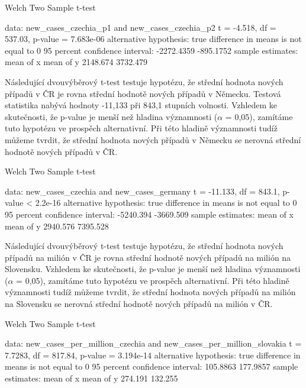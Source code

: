 \documentclass[a4paper, 12pt]{article}
\begin{document}
\begin{Schunk}
\begin{Soutput}
	Welch Two Sample t-test

data:  new_cases_czechia_p1 and new_cases_czechia_p2
t = -4.518, df = 537.03, p-value = 7.683e-06
alternative hypothesis: true difference in means is not equal to 0
95 percent confidence interval:
 -2272.4359  -895.1752
sample estimates:
mean of x mean of y 
 2148.674  3732.479 
\end{Soutput}
\end{Schunk}

\clearpage

Následující dvouvýběrový t-test testuje hypotézu, že střední hodnota nových případů
v ČR je rovna střední hodnotě nových případů v Německu. Testová statistika nabývá hodnoty
-11,133 při 843,1 stupních volnosti. Vzhledem ke skutečnosti, že p-value je menší
než hladina významnosti ($\alpha$ = 0,05), zamítáme tuto hypotézu ve prospěch alternativní.
Při této hladině významnosti tudíž můžeme tvrdit, že střední hodnota nových případů v Německu
se nerovná střední hodnotě nových případů v ČR.
\begin{Schunk}
\begin{Soutput}
	Welch Two Sample t-test

data:  new_cases_czechia and new_cases_germany
t = -11.133, df = 843.1, p-value < 2.2e-16
alternative hypothesis: true difference in means is not equal to 0
95 percent confidence interval:
 -5240.394 -3669.509
sample estimates:
mean of x mean of y 
 2940.576  7395.528 
\end{Soutput}
\end{Schunk}

Následující dvouvýběrový t-test testuje hypotézu, že střední hodnota nových případů na milión
v ČR je rovna střední hodnotě nových případů na milión na Slovensku. Vzhledem ke skutečnosti, že p-value je menší
než hladina významnosti ($\alpha$ = 0,05), zamítáme tuto hypotézu ve prospěch alternativní.
Při této hladině významnosti tudíž můžeme tvrdit, že střední hodnota nových případů na milión na Slovensku
se nerovná střední hodnotě nových případů na milión v ČR.

\begin{Schunk}
\begin{Soutput}
	Welch Two Sample t-test

data:  new_cases_per_million_czechia and new_cases_per_million_slovakia
t = 7.7283, df = 817.84, p-value = 3.194e-14
alternative hypothesis: true difference in means is not equal to 0
95 percent confidence interval:
 105.8863 177.9857
sample estimates:
mean of x mean of y 
  274.191   132.255 
\end{Soutput}
\end{Schunk}
\end{document}
